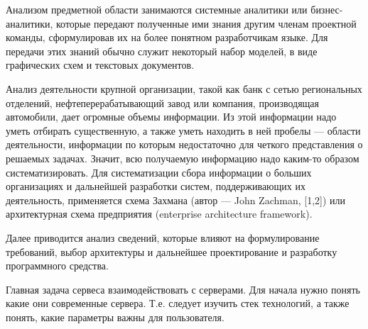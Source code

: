 Анализом предметной области занимаются системные аналитики или бизнес-аналитики, которые передают полученные ими знания другим членам проектной команды, сформулировав их на более понятном разработчикам языке. Для передачи этих знаний обычно служит некоторый набор моделей, в виде графических схем и текстовых документов.

Анализ деятельности крупной организации, такой как банк с сетью региональных отделений, нефтеперерабатывающий завод или компания, производящая автомобили, дает огромные объемы информации. Из этой информации надо уметь отбирать существенную, а также уметь находить в ней пробелы — области деятельности, информации по которым недостаточно для четкого представления о решаемых задачах. Значит, всю получаемую информацию надо каким-то образом систематизировать. Для систематизации сбора информации о больших организациях и дальнейшей разработки систем, поддерживающих их деятельность, применяется схема Захмана (автор — John Zachman, [1,2]) или архитектурная схема предприятия (enterprise architecture framework).

Далее приводится анализ сведений, которые влияют на формулирование требований, выбор архитектуры и дальнейшее проектирование и разработку программного средства.

Главная задача сервеса взаимодействовать с серверами. Для начала нужно понять какие они современные сервера. Т.е. следует изучить стек технологий, а также понять, какие параметры важны для пользователя.    














